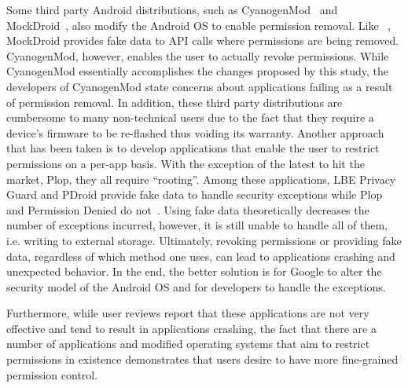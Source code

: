 Some third party Android distributions, such as CyanogenMod~\cite{Demers} and MockDroid~\cite{Beresford:2011:MTP:2184489.2184500}, also modify the Android OS to enable permission removal.  Like ~\cite{Hornyack:2011:TAD:2046707.2046780}, MockDroid provides fake data to API calls where permissions are being removed.  CyanogenMod, however, enables the user to actually revoke permissions.  While CyanogenMod essentially accomplishes the changes proposed by this study, the developers of CyanogenMod state concerns about applications failing as a result of permission removal.  In addition, these third party distributions are cumbersome to many non-technical users due to the fact that they require a device's firmware to be re-flashed thus voiding its warranty.  Another approach that has been taken is to develop applications that enable the user to restrict permissions on a per-app basis.  With the exception of the latest to hit the market, Plop, they all require “rooting”.  Among these applications, LBE Privacy Guard and PDroid provide fake data to handle security exceptions while Plop and Permission Denied do not~\cite{Hoffman}.  Using fake data theoretically decreases the number of exceptions incurred, however, it is still unable to handle all of them, i.e. writing to external storage.  Ultimately, revoking permissions or providing fake data, regardless of which method one uses, can lead to applications crashing and unexpected behavior.  In the end, the better solution is for Google to alter the security model of the Android OS and for developers to handle the exceptions.  

Furthermore, while user reviews report that these applications are not very effective and tend to result in applications crashing, the fact that there are a number of applications and modified operating systems that aim to restrict permissions in existence demonstrates that users desire to have more fine-grained permission control.  
